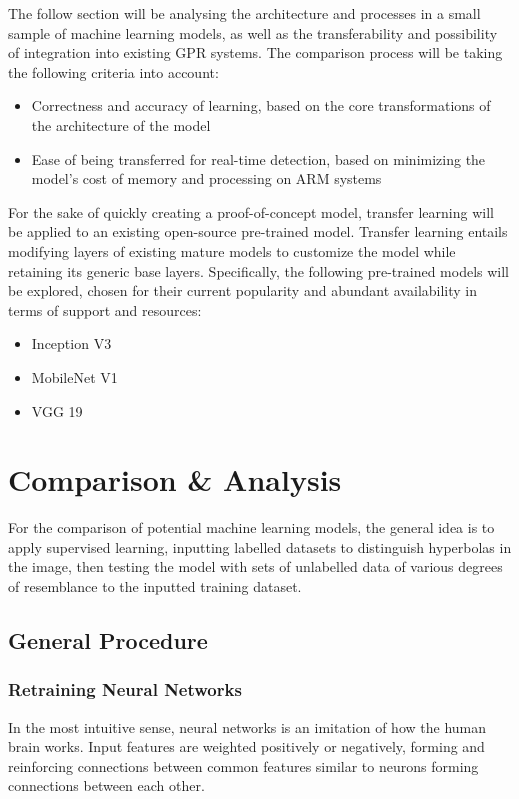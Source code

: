 \documentclass[se,blockletter]{uw-wkrpt}
\begin{document}
The follow section will be analysing the architecture and processes in a small sample of machine learning models, as well as the transferability and possibility of integration into existing GPR systems. The comparison process will be taking the following criteria into account:
\begin{itemize}
\item Correctness and accuracy of learning, based on the core transformations of the architecture of the model
\item Ease of being transferred for real-time detection, based on minimizing the model's cost of memory and processing on ARM systems
\end{itemize} 

For the sake of quickly creating a proof-of-concept model, transfer learning will be applied to an existing open-source pre-trained model. Transfer learning entails modifying layers of existing mature models to customize the model while retaining its generic base layers. Specifically, the following pre-trained models will be explored, chosen for their current popularity and abundant availability in terms of support and resources: 
\begin{itemize}
\item Inception V3
\item MobileNet V1
\item VGG 19
\end{itemize}

\section{Comparison \& Analysis}
For the comparison of potential machine learning models, the general idea is to apply supervised learning, inputting labelled datasets to distinguish hyperbolas in the image, then testing the model with sets of unlabelled data of various degrees of resemblance to the inputted training dataset.

\subsection{General Procedure}
\subsubsection{Retraining Neural Networks}
In the most intuitive sense, neural networks is an imitation of how the human brain works. Input features are weighted positively or negatively, forming and reinforcing connections between common features similar to neurons forming connections between each other.
\end{document}
